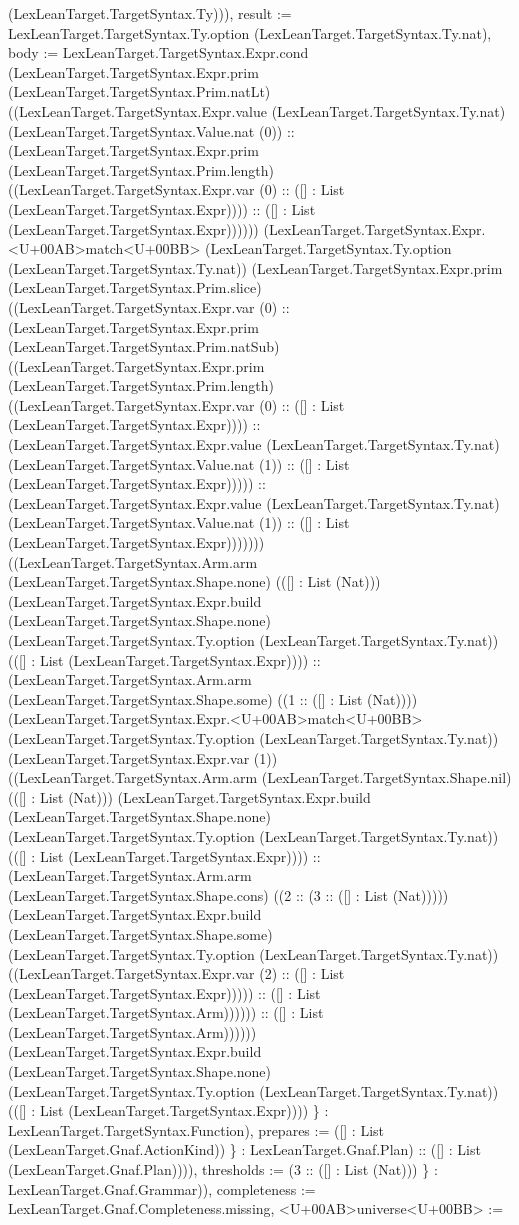 \documentclass[11pt]{article}
\begin{document}
(LexLeanTarget.TargetSyntax.Ty))), result := LexLeanTarget.TargetSyntax.Ty.option (LexLeanTarget.TargetSyntax.Ty.nat), body := LexLeanTarget.TargetSyntax.Expr.cond (LexLeanTarget.TargetSyntax.Expr.prim (LexLeanTarget.TargetSyntax.Prim.natLt) ((LexLeanTarget.TargetSyntax.Expr.value (LexLeanTarget.TargetSyntax.Ty.nat) (LexLeanTarget.TargetSyntax.Value.nat (0)) :: (LexLeanTarget.TargetSyntax.Expr.prim (LexLeanTarget.TargetSyntax.Prim.length) ((LexLeanTarget.TargetSyntax.Expr.var (0) :: ([] : List (LexLeanTarget.TargetSyntax.Expr)))) :: ([] : List (LexLeanTarget.TargetSyntax.Expr)))))) (LexLeanTarget.TargetSyntax.Expr.<U+00AB>match<U+00BB> (LexLeanTarget.TargetSyntax.Ty.option (LexLeanTarget.TargetSyntax.Ty.nat)) (LexLeanTarget.TargetSyntax.Expr.prim (LexLeanTarget.TargetSyntax.Prim.slice) ((LexLeanTarget.TargetSyntax.Expr.var (0) :: (LexLeanTarget.TargetSyntax.Expr.prim (LexLeanTarget.TargetSyntax.Prim.natSub) ((LexLeanTarget.TargetSyntax.Expr.prim (LexLeanTarget.TargetSyntax.Prim.length) ((LexLeanTarget.TargetSyntax.Expr.var (0) :: ([] : List (LexLeanTarget.TargetSyntax.Expr)))) :: (LexLeanTarget.TargetSyntax.Expr.value (LexLeanTarget.TargetSyntax.Ty.nat) (LexLeanTarget.TargetSyntax.Value.nat (1)) :: ([] : List (LexLeanTarget.TargetSyntax.Expr))))) :: (LexLeanTarget.TargetSyntax.Expr.value (LexLeanTarget.TargetSyntax.Ty.nat) (LexLeanTarget.TargetSyntax.Value.nat (1)) :: ([] : List (LexLeanTarget.TargetSyntax.Expr))))))) ((LexLeanTarget.TargetSyntax.Arm.arm (LexLeanTarget.TargetSyntax.Shape.none) (([] : List (Nat))) (LexLeanTarget.TargetSyntax.Expr.build (LexLeanTarget.TargetSyntax.Shape.none) (LexLeanTarget.TargetSyntax.Ty.option (LexLeanTarget.TargetSyntax.Ty.nat)) (([] : List (LexLeanTarget.TargetSyntax.Expr)))) :: (LexLeanTarget.TargetSyntax.Arm.arm (LexLeanTarget.TargetSyntax.Shape.some) ((1 :: ([] : List (Nat)))) (LexLeanTarget.TargetSyntax.Expr.<U+00AB>match<U+00BB> (LexLeanTarget.TargetSyntax.Ty.option (LexLeanTarget.TargetSyntax.Ty.nat)) (LexLeanTarget.TargetSyntax.Expr.var (1)) ((LexLeanTarget.TargetSyntax.Arm.arm (LexLeanTarget.TargetSyntax.Shape.nil) (([] : List (Nat))) (LexLeanTarget.TargetSyntax.Expr.build (LexLeanTarget.TargetSyntax.Shape.none) (LexLeanTarget.TargetSyntax.Ty.option (LexLeanTarget.TargetSyntax.Ty.nat)) (([] : List (LexLeanTarget.TargetSyntax.Expr)))) :: (LexLeanTarget.TargetSyntax.Arm.arm (LexLeanTarget.TargetSyntax.Shape.cons) ((2 :: (3 :: ([] : List (Nat))))) (LexLeanTarget.TargetSyntax.Expr.build (LexLeanTarget.TargetSyntax.Shape.some) (LexLeanTarget.TargetSyntax.Ty.option (LexLeanTarget.TargetSyntax.Ty.nat)) ((LexLeanTarget.TargetSyntax.Expr.var (2) :: ([] : List (LexLeanTarget.TargetSyntax.Expr))))) :: ([] : List (LexLeanTarget.TargetSyntax.Arm)))))) :: ([] : List (LexLeanTarget.TargetSyntax.Arm)))))) (LexLeanTarget.TargetSyntax.Expr.build (LexLeanTarget.TargetSyntax.Shape.none) (LexLeanTarget.TargetSyntax.Ty.option (LexLeanTarget.TargetSyntax.Ty.nat)) (([] : List (LexLeanTarget.TargetSyntax.Expr)))) \} : LexLeanTarget.TargetSyntax.Function), prepares := ([] : List (LexLeanTarget.Gnaf.ActionKind)) \} : LexLeanTarget.Gnaf.Plan) :: ([] : List (LexLeanTarget.Gnaf.Plan)))), thresholds := (3 :: ([] : List (Nat))) \} : LexLeanTarget.Gnaf.Grammar)), completeness := LexLeanTarget.Gnaf.Completeness.missing, <U+00AB>universe<U+00BB> := 
\end{document}
